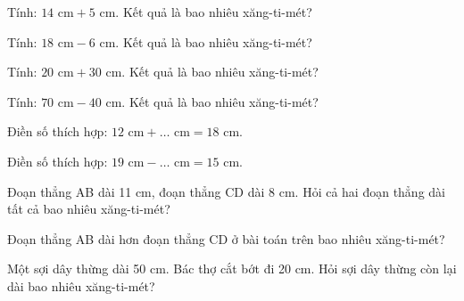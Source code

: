 \begin{ex}
Tính: $14\text{ cm} + 5\text{ cm}$. Kết quả là bao nhiêu xăng-ti-mét?
\end{ex}

\begin{ex}
Tính: $18\text{ cm} - 6\text{ cm}$. Kết quả là bao nhiêu xăng-ti-mét?
\end{ex}

\begin{ex}
Tính: $20\text{ cm} + 30\text{ cm}$. Kết quả là bao nhiêu xăng-ti-mét?
\end{ex}

\begin{ex}
Tính: $70\text{ cm} - 40\text{ cm}$. Kết quả là bao nhiêu xăng-ti-mét?
\end{ex}

\begin{ex}
Điền số thích hợp: $12\text{ cm} + \dots\text{ cm} = 18\text{ cm}$.
\end{ex}

\begin{ex}
Điền số thích hợp: $19\text{ cm} - \dots\text{ cm} = 15\text{ cm}$.
\end{ex}

\begin{ex}
Đoạn thẳng AB dài 11 cm, đoạn thẳng CD dài 8 cm. Hỏi cả hai đoạn thẳng dài tất cả bao nhiêu xăng-ti-mét?
\end{ex}

\begin{ex}
Đoạn thẳng AB dài hơn đoạn thẳng CD ở bài toán trên bao nhiêu xăng-ti-mét?
\end{ex}

\begin{ex}
Một sợi dây thừng dài 50 cm. Bác thợ cắt bớt đi 20 cm. Hỏi sợi dây thừng còn lại dài bao nhiêu xăng-ti-mét?
\end{ex}


